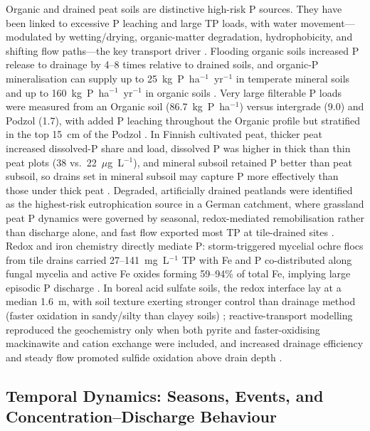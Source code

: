 \documentclass[11pt]{article}
\begin{document}
Organic and drained peat soils are distinctive high-risk P sources. They have been linked
to excessive P leaching and large TP loads, with water movement---modulated by
wetting/drying, organic-matter degradation, hydrophobicity, and shifting flow paths---the
key transport driver \parencite{Grenon2021}. Flooding organic soils increased P release to
drainage by 4--8 times relative to drained soils, and organic-P mineralisation can supply
up to 25~kg~P~ha$^{-1}$~yr$^{-1}$ in temperate mineral soils and up to
160~kg~P~ha$^{-1}$~yr$^{-1}$ in organic soils \parencite{Sharpley1995}. Very large filterable
P loads were measured from an Organic soil (86.7~kg~P~ha$^{-1}$) versus intergrade (9.0) and
Podzol (1.7), with added P leaching throughout the Organic profile but stratified in the top
15~cm of the Podzol \parencite{McDowell2015b}. In Finnish cultivated peat, thicker peat
increased dissolved-P share and load, dissolved P was higher in thick than thin peat plots
(38 vs.\ 22~$\mu$g~L$^{-1}$), and mineral subsoil retained P better than peat subsoil, so
drains set in mineral subsoil may capture P more effectively than those under thick peat
\parencite{YliHalla2022,Pham2023,Höyhtyä2025}. Degraded, artificially drained peatlands were
identified as the highest-risk eutrophication source in a German catchment, where grassland
peat P dynamics were governed by seasonal, redox-mediated remobilisation rather than
discharge alone, and fast flow exported most TP at tile-drained sites
\parencite{Tiemeyer2009}. Redox and iron chemistry directly mediate P: storm-triggered
mycelial ochre flocs from tile drains carried 27--141~mg~L$^{-1}$ TP with Fe and P
co-distributed along fungal mycelia and active Fe oxides forming 59--94\% of total Fe,
implying large episodic P discharge \parencite{Zimmer2016}. In boreal acid sulfate soils,
the redox interface lay at a median 1.6~m, with soil texture exerting stronger control than
drainage method (faster oxidation in sandy/silty than clayey soils)
\parencite{Virtanen2017}; reactive-transport modelling reproduced the geochemistry only when
both pyrite and faster-oxidising mackinawite and cation exchange were included, and increased
drainage efficiency and steady flow promoted sulfide oxidation above drain depth
\parencite{Salo2023}.

\subsection{Temporal Dynamics: Seasons, Events, and Concentration--Discharge Behaviour}
\end{document}
